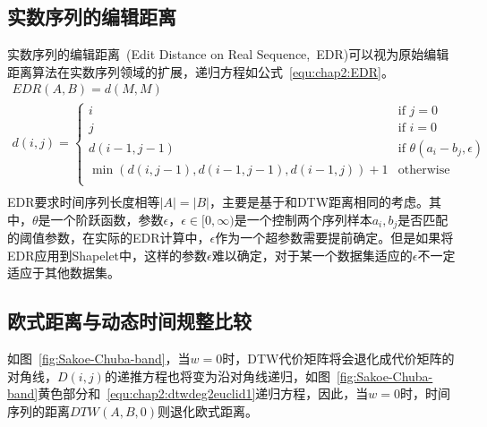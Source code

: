 \subsection{实数序列的编辑距离}
实数序列的编辑距离~\cite{chen2005robust}(Edit Distance on Real Sequence,~EDR)可以视为原始编辑距离算法在实数序列领域的扩展，递归方程如公式~\ref{equ:chap2:EDR}。
\begin{equation}
\label{equ:chap2:EDR}
\begin{array}{l}
EDR(A,B) = d(M,M) \\ [0.3cm]
d(i,j) = \begin{cases}
i & \text{if }j=0 \\
j & \text{if } i=0 \\
d(i-1,j-1) & \text{if } \theta(a_i-b_j,\epsilon) \\
\min(d(i,j-1),d(i-1,j-1),d(i-1,j)) + 1 & \text{otherwise} \\
\end{cases}\\[0.2cm]
\end{array}
\end{equation}
EDR要求时间序列长度相等$|A|=|B|$，主要是基于和DTW距离相同的考虑。其中，$\theta$是一个阶跃函数，参数$\epsilon$，$\epsilon\in [0,\infty)$是一个控制两个序列样本$a_i,b_j$是否匹配的阈值参数，在实际的EDR计算中，$\epsilon$作为一个超参数需要提前确定。但是如果将EDR应用到Shapelet中，这样的参数$\epsilon$难以确定，对于某一个数据集适应的$\epsilon$不一定适应于其他数据集。



\subsection{欧式距离与动态时间规整比较}
\label{chap02:euclid2Dtw}


如图~\ref{fig:Sakoe-Chuba-band}，当$w=0$时，DTW代价矩阵将会退化成代价矩阵的对角线，$D(i,j)$的递推方程也将变为沿对角线递归，如图~\ref{fig:Sakoe-Chuba-band}黄色部分和~\ref{equ:chap2:dtwdeg2euclid1}递归方程，因此，当$w=0$时，时间序列的距离$DTW(A,B,0)$则退化欧式距离。%

